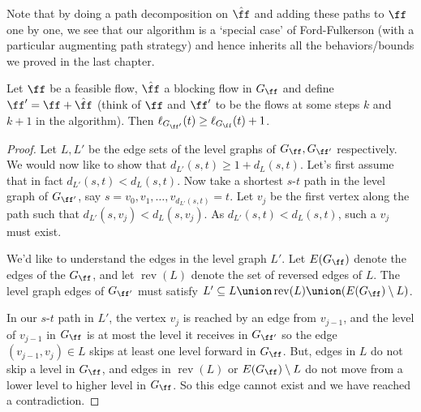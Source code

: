 Note that by doing a path decomposition on $\hat{\ff}$ and adding these paths to $\ff$ one by one, we see that
our algorithm is a `special case' of Ford-Fulkerson (with a particular augmenting path strategy) and hence
inherits all the behaviors/bounds we proved in the last chapter.

\begin{lemma}
  Let $\ff$ be a feasible flow, $\hat{\ff}$ a blocking flow in $G_{\ff}$ and define $\ff' = \ff+\hat{\ff}$ (think
  of $\ff$ and $\ff'$ to be the flows at some steps $k$ and $k+1$ in the algorithm). Then
  $\ell_{G_{\ff'}}(t) \geq \ell_{G_{\ff}}(t) + 1$.
\end{lemma}
\begin{proof}
  Let $L, L'$ be the edge sets of the level graphs of $G_{\ff}, G_{\ff'}$
  respectively.
  We would now like to show that $d_{L'}(s, t) \geq 1 + d_L(s, t)$. Let's first assume that in fact
  $d_{L'}(s, t) < d_L(s, t)$. Now take a shortest $s$-$t$ path in the level graph of
  $G_{\ff'}$, say $s=v_0, v_1, \dots, v_{d_{L'}(s, t)} =  t$.
  Let $v_j$ be the first vertex along the path such that
  $d_{L'}(s, v_j) < d_L(s, v_j)$.
  As $d_{L'}(s, t) < d_L(s, t)$, such a $v_j$ must exist.

  We'd like to understand the edges in the level
  graph $L'$.
  Let $E(G_{\ff})$ denote the edges of the $G_{\ff}$,
  and let $\operatorname{rev}(L)$ denote the set of
  reversed edges of $L$.
  The level graph edges of $G_{\ff'}$ must satisfy
  $L' \subseteq L \union
  \operatorname{rev}(L) \union (E(G_{\ff}) \setminus
  L)$.

  In our $s$-$t$ path in $L'$, the vertex $v_j$ is reached by an edge from $v_{j-1}$,
  and the level of $v_{j-1}$ in $G_{\ff}$ is at most the level it receives in $G_{\ff'}$
  so the edge $(v_{j-1},v_j) \in L$ skips
  at least one level forward  in $G_{\ff}$.
  But, edges in $L$ do not skip a level in
  $G_{\ff}$, and edges in
  $\operatorname{rev}(L)$ or
  $E(G_{\ff}) \setminus L$ do not move from a lower level to higher
  level in $G_{\ff}$.
  So this edge cannot exist and we have reached a contradiction.


\end{proof}
